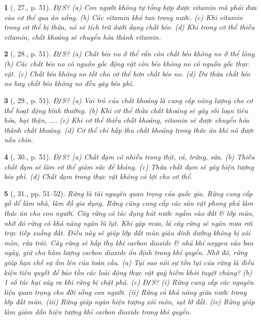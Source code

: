 \documentclass{article}
\newtheorem{baitoan}{}
\begin{document}
\begin{baitoan}[\cite{ncpt_KHTN_6_tap_1}, 27., p. 51]
	{\rm Đ{\tt/}S?} (a) Con người không tự tổng hợp được vitamin mà phải đưa vào cơ thể qua ăn uống. (b) Các vitamin khó tan trong nước. (c) Khi vitamin trong cơ thể bị thừa, nó sẽ tích trữ dưới dạng chất béo. (d) Khi trong cơ thể thiếu vitamin, chất khoáng sẽ chuyển hóa thành vitamin.
\end{baitoan}

\begin{baitoan}[\cite{ncpt_KHTN_6_tap_1}, 28., p. 51]
	{\rm Đ{\tt/}S?} (a) Chất béo no ở thể rắn còn chất béo không no ở thể lỏng. (b) Các chất béo no có nguồn gốc động vật còn béo không no có nguồn gốc thực vật. (c) Chất béo không no tốt cho cơ thể hơn chất béo no. (d) Dư thừa chất béo no hay chất béo không no đều gây béo phì.
\end{baitoan}

\begin{baitoan}[\cite{ncpt_KHTN_6_tap_1}, 29., p. 51]
	{\rm Đ{\tt/}S?} (a) Vai trò của chất khoáng là cung cấp năng lượng cho cơ thể hoạt động bình thường. (b) Khi cơ thể thừa chất khoáng sẽ gây rối loạn tiêu hóa, hại thận, $\ldots$. (c) Khi cơ thể thiếu chất khoáng, vitamin sẽ được chuyển hóa thành chất khoáng. (d) Cơ thể chỉ hấp thu chất khoáng trong thức ăn khi nó được nấu chín.
\end{baitoan}

\begin{baitoan}[\cite{ncpt_KHTN_6_tap_1}, 30., p. 51]
	{\rm Đ{\tt/}S?} (a) Chất đạm có nhiều trong thịt, cá, trứng, sữa. (b) Thiếu chất đạm sẽ làm cơ thể giảm sức đề kháng. (c) Thừa chất đạm sẽ gây hiện tượng béo phì. (d) Chất đạm trong thực vật không có lợi cho cơ thể.
\end{baitoan}

\begin{baitoan}[\cite{ncpt_KHTN_6_tap_1}, 31., pp. 51--52]
	Rừng là tài nguyên quan trọng của quốc gia. Rừng cung cấp gỗ để làm nhà, làm đồ gia dụng. Rừng cũng cung cấp các sản vật phong phú làm thức ăn cho con người. Cây rừng có tác dụng hút nước ngầm vào đất \& lớp mùn, nhờ đó rừng có khả năng ngăn lũ lụt. Khi gặp mưa, lá cây rừng sẽ ngăn mưa rơi trực tiếp xuống đất. Điều này sẽ giúp lớp đất mùn giàu dinh dưỡng không bị xói mòn, rửa trôi. Cây rừng sẽ hấp thụ khí carbon dioxide \& nhả khí oxygen vào ban ngày, giữ cho hàm lượng carbon dioxide ổn định trong khí quyển. Nhờ đó, rừng giúp hạn chế sự ấm lên của toàn cầu. (a) Tại sao nói sự tồn tại của rừng là điều kiện tiên quyết để bảo tồn các loài động thực vật quý hiếm khỏi tuyệt chủng? (b) 1 số tác hại xảy ra khi rừng bị chặt phá. (c) {\rm Đ{\tt/}S?} (i) Rừng cung cấp các nguyên liệu quan trọng cho đời sống con người. (ii) Rừng có khả năng giữa nước trong lớp đất mùn. (iii) Rừng giúp ngăn hiện tượng xói mòn, sạt lở đất. (iv) Rừng giúp làm giảm dần hiện tượng khí carbon dioxide trong khí quyển.
\end{baitoan}
\end{document}
